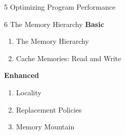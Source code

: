 \documentclass{beamer}
\begin{document}
\begin{frame}{5 Optimizing Program Performance}
	\only<1> {
	}
	 {
	}
\end{frame}


\begin{frame}{6 The Memory Hierarchy}
\textbf{Basic}
\begin{enumerate}
	\item The Memory Hierarchy
	\item Cache Memories: Read and Write
\end{enumerate}
\textbf{Enhanced}
\begin{enumerate}
	\item Locality
	\item Replacement Policies
	\item Memory Mountain
\end{enumerate}
\end{frame}
\end{document}
